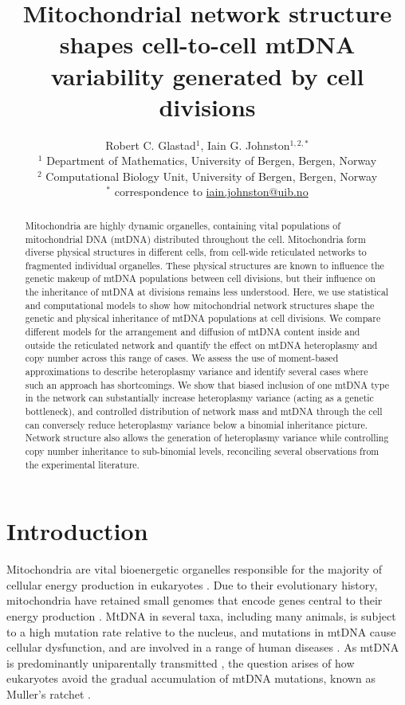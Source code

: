 \documentclass{article}
\title{Mitochondrial network structure shapes cell-to-cell mtDNA variability generated by cell divisions}
\author{Robert C. Glastad${}^1$, Iain G. Johnston${}^{1,2,*}$ \\ \footnotesize ${}^1$ Department of Mathematics, University of Bergen, Bergen, Norway \\ \footnotesize ${}^2$ Computational Biology Unit, University of Bergen, Bergen, Norway \\ \footnotesize ${}^*$ correspondence to \url{iain.johnston@uib.no}}
\date{}
\begin{document}
\maketitle
\begin{abstract}
Mitochondria are highly dynamic organelles, containing vital populations of mitochondrial DNA (mtDNA) distributed throughout the cell. Mitochondria form diverse physical structures in different cells, from cell-wide reticulated networks to fragmented individual organelles. These physical structures are known to influence the genetic makeup of mtDNA populations between cell divisions, but their influence on the inheritance of mtDNA at divisions remains less understood. Here, we use statistical and computational models to show how mitochondrial network structures shape the genetic and physical inheritance of mtDNA populations at cell divisions. We compare different models for the arrangement and diffusion of mtDNA content inside and outside the reticulated network and quantify the effect on mtDNA heteroplasmy and copy number across this range of cases. We assess the use of moment-based approximations to describe heteroplasmy variance and identify several cases where such an approach has shortcomings. We show that biased inclusion of one mtDNA type in the network can substantially increase heteroplasmy variance (acting as a genetic bottleneck), and controlled distribution of network mass and mtDNA through the cell can conversely reduce heteroplasmy variance below a binomial inheritance picture. Network structure also allows the generation of heteroplasmy variance while controlling copy number inheritance to sub-binomial levels, reconciling several observations from the experimental literature. 
\end{abstract}


\section{Introduction}
Mitochondria are vital bioenergetic organelles responsible for the majority of cellular energy production in eukaryotes \citep{spinelli2018multifaceted, smith2015mitochondrial}. Due to their evolutionary history, mitochondria have retained small genomes \citep{martin1998gene, gray2001origin, roger2017origin} that encode genes central to their energy production \citep{johnston2016evolutionary, allen2017corr}. MtDNA in several taxa, including many animals, is subject to a high mutation rate relative to the nucleus, and mutations in mtDNA cause cellular dysfunction, and are involved in a range of human diseases \citep{wallace2013mitochondrial, burr2018mitochondrial}. As mtDNA is predominantly uniparentally transmitted \citep{greiner2015most}, the question arises of how eukaryotes avoid the gradual accumulation of mtDNA mutations, known as Muller's ratchet \citep{muller1964relation}. 
\end{document}
